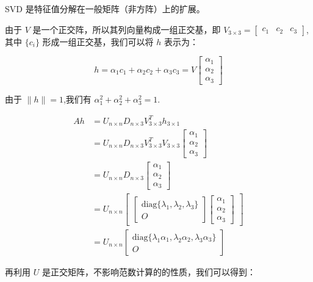 SVD 是特征值分解在一般矩阵（非方阵）上的扩展。

由于 $V$ 是一个正交阵，所以其列向量构成一组正交基，即 $V_{3 \times 3} = \begin{bmatrix} c_1 & c_2 & c_3 \end{bmatrix}$,其中 $\{c_i\}$ 形成一组正交基，我们可以将 $h$ 表示为：

$$
h = \alpha_1 c_1 + \alpha_2 c_2 + \alpha_3 c_3 = V\begin{bmatrix} \alpha_1 \\ \alpha_2 \\ \alpha_3 \end{bmatrix}
$$

由于 $\|h\| = 1$,我们有 $\alpha_1^2 + \alpha_2^2 + \alpha_3^2 = 1$.

$$
\begin{aligned}
Ah &= U_{n \times n} D_{n \times 3} V^T_{3 \times 3} h_{3 \times 1} \\
&= U_{n \times n} D_{n \times 3} V^T_{3 \times 3} V_{3 \times 3} \begin{bmatrix} \alpha_1 \\ \alpha_2 \\ \alpha_3 \end{bmatrix} \\
&= U_{n \times n} D_{n \times 3} \begin{bmatrix} \alpha_1 \\ \alpha_2 \\ \alpha_3 \end{bmatrix} \\
&= U_{n \times n} \begin{bmatrix} \begin{bmatrix}
\text{diag}\{\lambda_1, \lambda_2, \lambda_3\} \\
O
\end{bmatrix} \begin{bmatrix} \alpha_1 \\ \alpha_2 \\ \alpha_3 \end{bmatrix} \end{bmatrix} \\
&= U_{n \times n} \begin{bmatrix} \text{diag}\{\lambda_1 \alpha_1, \lambda_2 \alpha_2, \lambda_3 \alpha_3\} \\ O \end{bmatrix}
\end{aligned}
$$

再利用 $U$ 是正交矩阵，不影响范数计算的的性质，我们可以得到：


